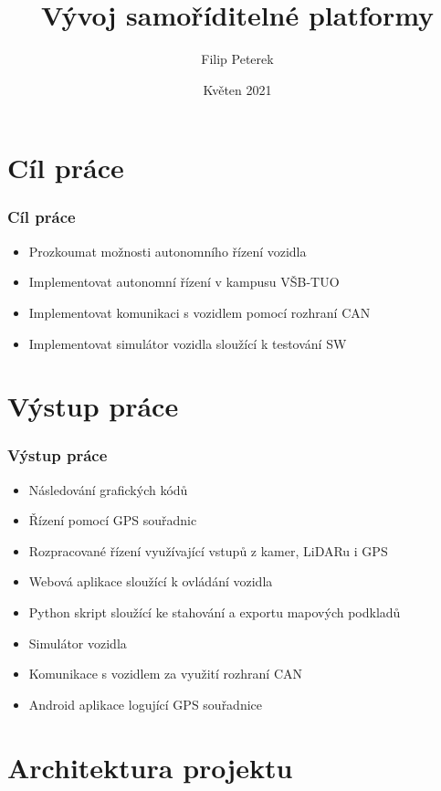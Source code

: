 \documentclass{beamer}
\title{Vývoj samoříditelné platformy}
\author{Filip Peterek}
\institute{Vysoká škola Báňská - Technická univerzita Ostrava}
\date{Květen 2021}
\begin{document}
\frame{\titlepage}

\section{Cíl práce}
\begin{frame}
    \frametitle{Cíl práce}

    \begin{itemize}
        \item Prozkoumat možnosti autonomního řízení vozidla
        \item Implementovat autonomní řízení v kampusu VŠB-TUO
        \item Implementovat komunikaci s vozidlem pomocí rozhraní CAN
        \item Implementovat simulátor vozidla sloužící k testování SW
    \end{itemize}

\end{frame}

\section{Výstup práce}
\begin{frame}
    \frametitle{Výstup práce}
    
    \begin{itemize}
        \item Následování grafických kódů
        \item Řízení pomocí GPS souřadnic
        \item Rozpracované řízení využívající vstupů z kamer, LiDARu i GPS
        \item Webová aplikace sloužící k ovládání vozidla
        \item Python skript sloužící ke stahování a exportu mapových podkladů
        \item Simulátor vozidla
        \item Komunikace s vozidlem za využití rozhraní CAN
        \item Android aplikace logující GPS souřadnice
    \end{itemize}
\end{frame}

\section{Architektura projektu}
\end{document}
